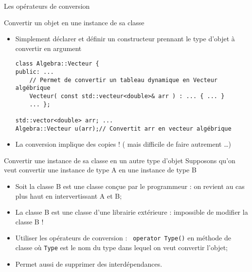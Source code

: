 \documentclass[handout,10pt]{beamer}
\begin{document}
\begin{frame}[fragile]{Les opérateurs de conversion}
\tiny
\begin{block}{Convertir un objet en une instance de sa classe}
\begin{itemize}
\item Simplement déclarer et définir un constructeur prennant le type d'objet à convertir en argument
\begin{lstlisting}
class Algebra::Vecteur {
public: ...
    // Permet de convertir un tableau dynamique en Vecteur algébrique
    Vecteur( const std::vecteur<double>& arr ) : ... { ... }
    ... };
    
std::vector<double> arr; ...
Algebra::Vecteur u(arr);// Convertit arr en vecteur algébrique
\end{lstlisting}
\item La conversion implique des copies ! ( mais difficile de faire autrement \ldots )
\end{itemize}
\end{block}

\begin{block}{Convertir une instance de sa classe en un autre type d'objet}
Supposons qu'on veut convertir une instance de type A en une instance de type B
\begin{itemize}
\item Soit la classe B est une classe conçue par le programmeur :  on revient au cas plus haut en intervertissant A et B;
\item La classe B est une classe d'une librairie extérieure : impossible de modifier la classe B !
\item Utiliser les opérateurs de conversion : \lstinline$ operator Type()$ en méthode de classe où \lstinline$Type$ est le nom du type dans lequel on veut convertir l'objet;
\item Permet aussi de supprimer des interdépendances.
\end{itemize}
\end{block}
\end{frame}
\end{document}
